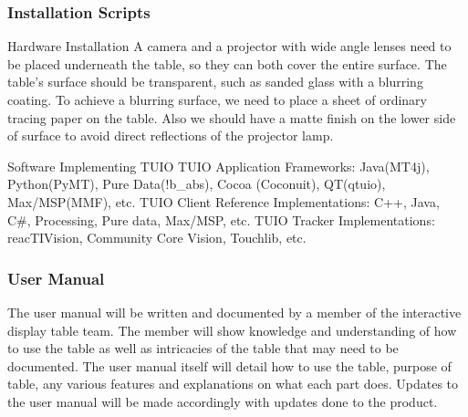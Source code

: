 \subsubsection{Installation Scripts}
Hardware Installation
A camera and a projector with wide angle lenses need to be placed underneath the table, so they can both cover the entire surface. The table's surface should be transparent, such as sanded glass with a blurring coating. To achieve a blurring surface, we need to place a sheet of ordinary tracing paper on the table. Also we should have a matte finish on the lower side of surface to avoid direct reflections of the projector lamp. 

Software Implementing TUIO
    TUIO Application Frameworks: Java(MT4j), Python(PyMT), Pure Data(!b_abs), Cocoa (Coconuit), QT(qtuio), Max/MSP(MMF), etc. 
    TUIO Client Reference Implementations: C++, Java, C#, Processing, Pure data, Max/MSP, etc.
    TUIO Tracker Implementations: reacTIVision, Community Core Vision, Touchlib, etc.
    
\subsubsection{User Manual}
The user manual will be written and documented by a member of the interactive display table team. The member will show knowledge and understanding of how to use the table as well as intricacies of the table that may need to be documented. The user manual itself will detail how to use the table, purpose of table, any various features and explanations on what each part does. Updates to the user manual will be made accordingly with updates done to the product. 
